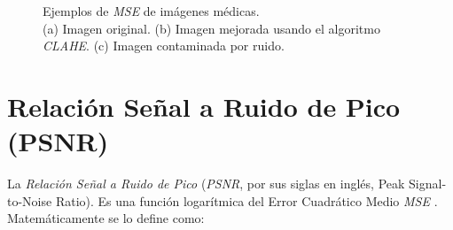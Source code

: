 \begin{figure}[H]
    \begin{center}
    \end{center}
    \caption{Ejemplos de \textit{MSE} de imágenes médicas. \\
    (a) Imagen original.
    (b) Imagen mejorada usando el algoritmo \textit{CLAHE}.
    (c) Imagen contaminada por ruido.}
    \label{fig:mse}
\end{figure}


\section{Relación Señal a Ruido de Pico (PSNR)} 
\label{sec:psnr}

La \textit{Relación Señal a Ruido de Pico} (\textit{PSNR}, por sus siglas en inglés, Peak Signal-to-Noise Ratio). Es una función logarítmica del Error Cuadrático Medio \textit{MSE} \cite{annadurai2007fundamentals}.
Matemáticamente se lo define como:

